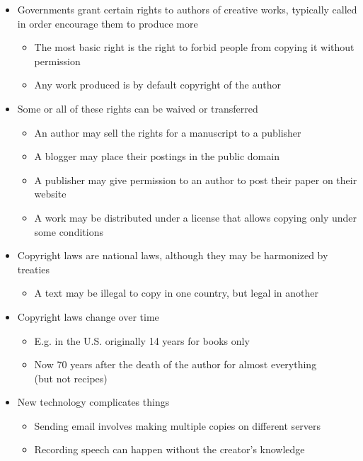 \documentclass[a4paper,landscape,headrule,footrule,xetex]{foils}
\begin{document}
\begin{itemize}
\item Governments grant certain rights to authors of creative works,
  typically called  in order encourage them
  to produce more
  \begin{itemize}
  \item The most basic right is the right to forbid people from
    copying it without permission
  \item Any work produced is by default copyright of the author
  \end{itemize}
\item Some or all of these rights can be waived or transferred
  \begin{itemize}
  \item An author may sell the rights for a manuscript to a publisher
  \item A blogger may place their postings in the public domain
  \item A publisher may give permission to an author to post their
    paper on their website
  \item A work may be distributed under a license that allows copying only under some conditions
  \end{itemize}
\newpage
\item Copyright laws are national laws, although they may be
  harmonized by treaties
  \begin{itemize}
  \item A text may be illegal to copy in one country, but legal in another
  \end{itemize}
\item Copyright laws change over time
  \begin{itemize}
  \item E.g. in the U.S. originally 14 years for books only
  \item Now 70 years after the death of the author for almost
    everything \\ (but not recipes)
  \end{itemize}
\item New technology complicates things
  \begin{itemize}
  \item Sending email involves making multiple copies on different servers
  \item Recording speech can happen without the creator's knowledge
  \end{itemize}
\end{itemize}
\end{document}
